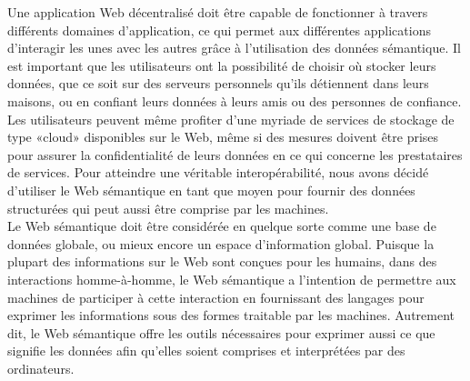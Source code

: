 \documentclass[a4paper]{article}
\begin{document}
Une application Web décentralisé doit être capable de fonctionner à travers différents domaines d'application, ce qui permet aux différentes applications d'interagir les unes avec les autres grâce à l'utilisation des données sémantique. Il est important que les utilisateurs ont la possibilité de choisir où stocker leurs données, que ce soit sur des serveurs personnels qu'ils détiennent dans leurs maisons, ou en confiant leurs données à leurs amis ou des personnes de confiance. Les utilisateurs peuvent même profiter d'une myriade de  services de stockage de type «cloud» disponibles sur le Web, même si des mesures doivent être prises pour assurer la confidentialité de leurs données en ce qui concerne les prestataires de services. Pour atteindre une véritable interopérabilité, nous avons décidé d'utiliser le Web sémantique en tant que moyen pour fournir des données structurées qui peut aussi être comprise par les machines.\\


Le Web sémantique doit être considérée en quelque sorte comme une base de données globale, ou mieux encore un espace d'information global.  Puisque la plupart des informations sur le Web sont conçues pour les humains, dans des interactions homme-à-homme, le Web sémantique a l'intention de permettre aux machines de participer à cette interaction en fournissant des langages pour exprimer les informations sous des formes traitable par les machines. Autrement dit, le Web sémantique offre les outils nécessaires pour exprimer aussi ce que signifie les données afin qu'elles soient comprises et interprétées par des ordinateurs.\\
\end{document}
